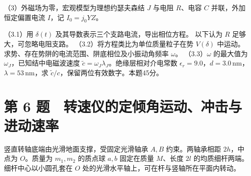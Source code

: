 \documentclass[12pt,a4paper,fontset=fandol]{ctexart}
\begin{document}
（3）外磁场为零，宏观模型为理想约瑟夫森结 \(J\) 与电阻 \(R\)、电容 \(C\)
并联，外加恒定偏置电流 \(I\)，记 \(I_0=j_0YZ\)。

\begin{center}
\begin{minipage}{\linewidth}
\centering\begingroup
{}
\ifdim\wd\diagrambox>.88\linewidth
\sbox{\diagrambox}{\resizebox{.88\linewidth}{!}{\usebox{\diagrambox}}}
\fi
\ifdim\ht\diagrambox>.40\textheight
\resizebox{!}{.40\textheight}{\usebox{\diagrambox}}
\else\usebox{\diagrambox}\fi
\par{}
\endgroup\end{minipage}
\end{center}

（3.1）用 \(\delta(t)\) 及其导数表示三个支路电流，导出相位方程。
以下认为 \(R\) 足够大，可忽略电阻支路。
（3.2）将方程类比为单位质量粒子在势 \(V(\delta)\)
中运动。求势、存在势阱的电流范围、阱底相位及小振动角频率 \(\omega\)。
（3.3）\(\omega\) 的最大值为 \(\omega_J\)，已知结中电磁波速度
\(\tilde c=\omega_J\lambda_J\)。绝缘层相对介电常数
\(\epsilon_r=9.0\)，\(d=3.0\,\mathrm{nm}\)，\(\lambda=53\,\mathrm{nm}\)，求
\(\tilde c/c\)，保留两位有效数字。本题45分。

\clearpage

\section{第 6
题　转速仪的定倾角运动、冲击与进动速率}\label{ux7b2c-6-ux9898-ux8f6cux901fux4eeaux7684ux5b9aux503eux89d2ux8fd0ux52a8ux51b2ux51fbux4e0eux8fdbux52a8ux901fux7387}

竖直转轴底端由光滑地面支撑，受固定光滑轴承 \(A,B\) 约束。两轴承相距
\(2h\)，中点为 \(O\)。质量为 \(m_1,m_2\) 的质点球 \(a,b\) 固定在质量
\(M\)、长度 \(2l\) 的均质细杆两端。细杆中心以小圆孔套在 \(O\)
处的光滑水平轴上，可在杆与竖轴所在平面内转动。
\end{document}
